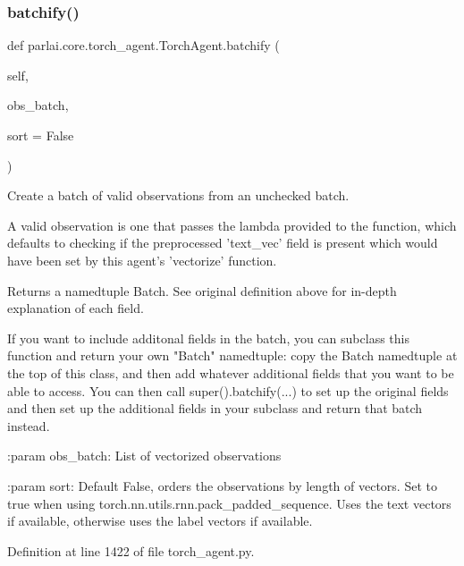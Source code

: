 \subsubsection{\texorpdfstring{batchify()}{batchify()}}
{\footnotesize\ttfamily def parlai.\+core.\+torch\+\_\+agent.\+Torch\+Agent.\+batchify (\begin{DoxyParamCaption}\item[{}]{self,  }\item[{}]{obs\+\_\+batch,  }\item[{}]{sort = {\ttfamily False} }\end{DoxyParamCaption})}

\begin{DoxyVerb}Create a batch of valid observations from an unchecked batch.

A valid observation is one that passes the lambda provided to the
function, which defaults to checking if the preprocessed 'text_vec'
field is present which would have been set by this agent's 'vectorize'
function.

Returns a namedtuple Batch. See original definition above for in-depth
explanation of each field.

If you want to include additonal fields in the batch, you can subclass
this function and return your own "Batch" namedtuple: copy the Batch
namedtuple at the top of this class, and then add whatever additional
fields that you want to be able to access. You can then call
super().batchify(...) to set up the original fields and then set up the
additional fields in your subclass and return that batch instead.

:param obs_batch:
    List of vectorized observations

:param sort:
    Default False, orders the observations by length of vectors. Set to
    true when using torch.nn.utils.rnn.pack_padded_sequence.  Uses the text
    vectors if available, otherwise uses the label vectors if available.
\end{DoxyVerb}
 

Definition at line 1422 of file torch\+\_\+agent.\+py.


